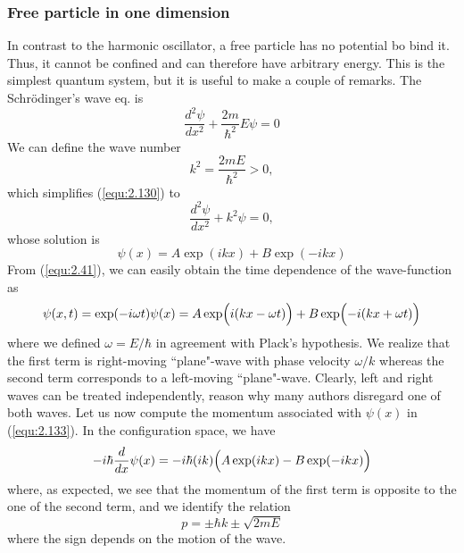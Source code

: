 \subsubsection{Free particle in one dimension}
In contrast to the harmonic oscillator, a free particle has
no potential bo bind it. Thus, it cannot be confined and can
therefore have arbitrary energy. This is the simplest
quantum system, but it is useful to make a couple of
remarks.
The Schrödinger's wave eq. is
\begin{equation}
  \frac{d^2 \psi}{d x^2} + \frac{2m}{\hbar^2} E \psi = 0
  \label{equ:2.130}
\end{equation}
We can define the wave number
\begin{equation}
  k^2 = \frac{2mE}{\hbar^2} > 0,
  \label{equ:1.131}
\end{equation}
which simplifies (\ref{equ:2.130}) to
\begin{equation}
  \frac{d^2 \psi}{dx^2 } + k^2 \psi = 0,
  \label{equ:1.132}
\end{equation}
whose solution is
\begin{equation}
  \psi(x) = A \exp(ikx) + B \exp(-ikx)
  \label{equ:2.133}
\end{equation}
From (\ref{equ:2.41}), we can easily obtain the time
dependence of the wave-function as
\begin{equation}
  \psi(x,t) = \exp(-i\omega t) \psi(x) = A
  \exp\Bigl(i(kx-\omega t)\Bigr)
  +
  B
  \exp\Bigl(-i(kx+\omega t)\Bigr)
  \label{equ:2.134}
\end{equation}
where we defined $\omega = E/\hbar$ in agreement with
Plack's hypothesis.
We realize that the first term is right-moving ``plane"-wave
with phase velocity $\omega / k$ whereas the second term
corresponds to a left-moving ``plane"-wave. Clearly, left
and right waves can be treated independently, reason why
many authors disregard one of both waves.
Let us now compute the momentum associated with $\psi(x)$ in
(\ref{equ:2.133}). In the configuration space, we have
\begin{equation}
  -i\hbar \frac{d}{dx} \psi(x) = -i\hbar(ik) \Bigl(A
  \exp(ikx) - B\exp(-ikx)\Bigr)
  \label{equ:2.135}
\end{equation}
where, as expected, we see that the momentum of the  first
term is opposite to the one of the second term, and we
identify the relation
\begin{equation}
  p = \pm \hbar k \pm \sqrt{2mE}
  \label{equ:2.136}
\end{equation}
where the sign depends on the motion of the wave.
